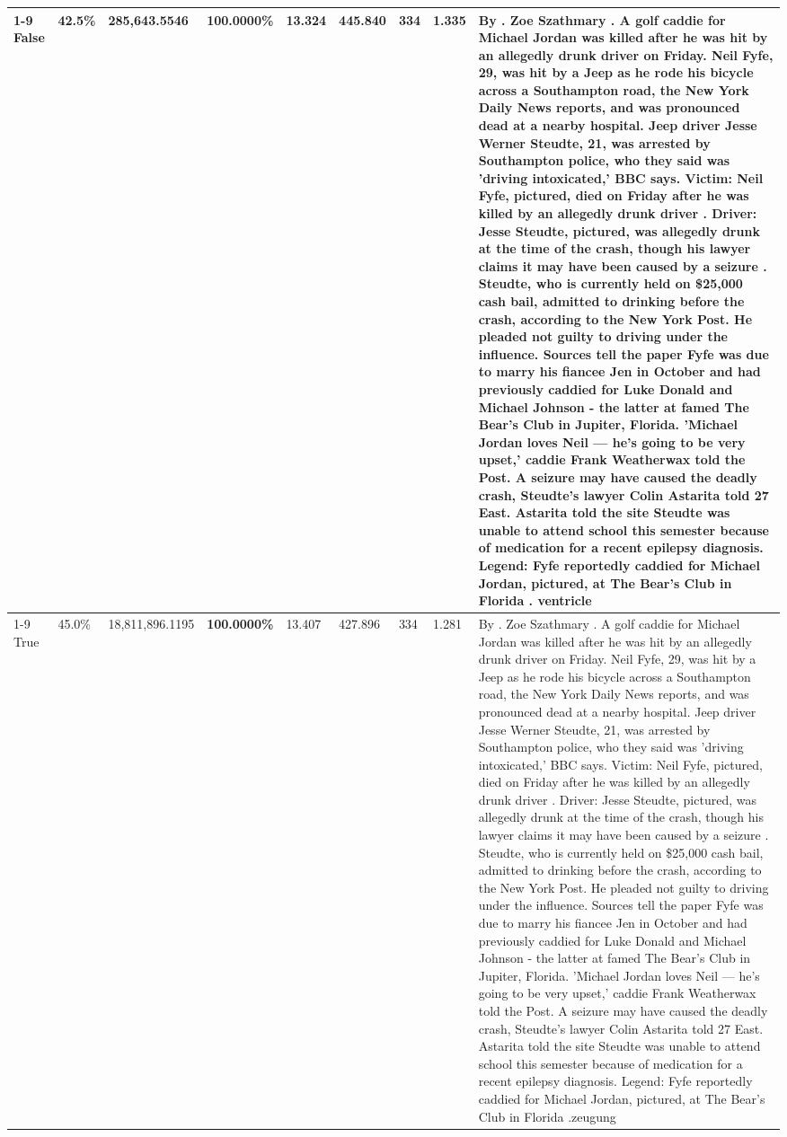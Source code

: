 \begin{table}[H]
\begin{tabular}{lllrlllll}
\cline{1-9}
False & 42.5\% & \color{red} 285,643.5546 & \bfseries \color{red} 100.0000\% & 13.324 & 445.840 & 334 & 1.335 & By . Zoe Szathmary . A golf caddie for Michael Jordan was killed after he was hit by an allegedly drunk driver on Friday. Neil Fyfe, 29, was hit by a Jeep as he rode his bicycle across a Southampton road, the New York Daily News reports, and was pronounced dead at a nearby hospital. Jeep driver Jesse Werner Steudte, 21, was arrested by Southampton police, who they said was 'driving intoxicated,' BBC says. Victim: Neil Fyfe, pictured, died on Friday after he was killed by an allegedly drunk driver . Driver: Jesse Steudte, pictured, was allegedly drunk at the time of the crash, though his lawyer claims it may have been caused by a seizure . Steudte, who is currently held on \$25,000 cash bail, admitted to drinking before the crash, according to the New York Post. He pleaded not guilty to driving under the influence. Sources tell the paper Fyfe was due to marry his fiancee Jen in October and had previously caddied for Luke Donald and Michael Johnson - the latter at famed The Bear's Club in Jupiter, Florida. 'Michael Jordan loves Neil — he’s going to be very upset,' caddie Frank Weatherwax told the Post. A seizure may have caused the deadly crash, Steudte's lawyer Colin Astarita told 27 East. Astarita told the site Steudte was unable to attend school this semester because of medication for a recent epilepsy diagnosis. Legend: Fyfe reportedly caddied for Michael Jordan, pictured, at The Bear's Club in Florida . ventricle \\
\cline{1-9}
True & 45.0\% & 18,811,896.1195 & \bfseries \color{red} 100.0000\% & 13.407 & 427.896 & 334 & 1.281 & By . Zoe Szathmary . A golf caddie for Michael Jordan was killed after he was hit by an allegedly drunk driver on Friday. Neil Fyfe, 29, was hit by a Jeep as he rode his bicycle across a Southampton road, the New York Daily News reports, and was pronounced dead at a nearby hospital. Jeep driver Jesse Werner Steudte, 21, was arrested by Southampton police, who they said was 'driving intoxicated,' BBC says. Victim: Neil Fyfe, pictured, died on Friday after he was killed by an allegedly drunk driver . Driver: Jesse Steudte, pictured, was allegedly drunk at the time of the crash, though his lawyer claims it may have been caused by a seizure . Steudte, who is currently held on \$25,000 cash bail, admitted to drinking before the crash, according to the New York Post. He pleaded not guilty to driving under the influence. Sources tell the paper Fyfe was due to marry his fiancee Jen in October and had previously caddied for Luke Donald and Michael Johnson - the latter at famed The Bear's Club in Jupiter, Florida. 'Michael Jordan loves Neil — he’s going to be very upset,' caddie Frank Weatherwax told the Post. A seizure may have caused the deadly crash, Steudte's lawyer Colin Astarita told 27 East. Astarita told the site Steudte was unable to attend school this semester because of medication for a recent epilepsy diagnosis. Legend: Fyfe reportedly caddied for Michael Jordan, pictured, at The Bear's Club in Florida .zeugung \\

\end{tabular}
\end{table}
